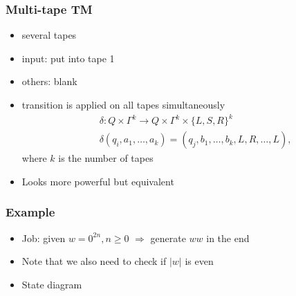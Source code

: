 \begin{frame}[allowframebreaks] \frametitle{Multi-tape TM}
  \begin{itemize}
\item several tapes
\item input: put into tape 1

\item
  [] others: blank
\item transition is applied on all tapes simultaneously
  \begin{eqnarray*}
&& \delta: Q \times \Gamma^k \rightarrow 
Q \times \Gamma^k \times \{L, S, R\}^k     \\
&& \delta(q_i, a_1, \ldots, a_k)
= (q_j, b_1, \ldots, b_k, L, R, \ldots, L),
  \end{eqnarray*}
where $k$ is the number of tapes
\item Looks more powerful but equivalent


\end{itemize}\end{frame} \begin{frame}[allowframebreaks] \frametitle{Example}

  \begin{itemize}
\item Job: given $w = 0^{2n}, n \geq 0$
$\Rightarrow$ generate $ww$ in the end

\item
  [] Note that we also need to check if $|w|$ is even

\item State diagram

  \end{itemize}


\end{frame}

